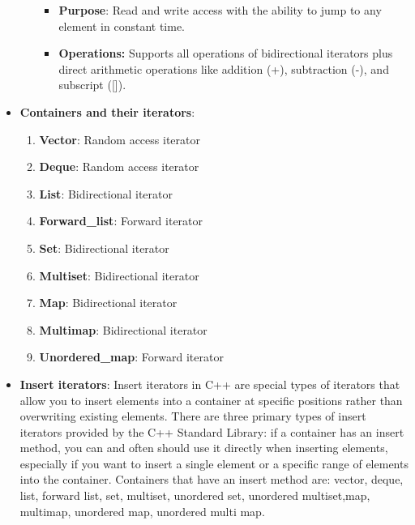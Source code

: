 \documentclass{report}
\begin{document}
\begin{itemize}
\begin{enumerate}
                    \begin{itemize}
                        \item \textbf{Purpose}: Read and write access with the ability to jump to any element in constant time.
                        \item \textbf{Operations:} Supports all operations of bidirectional iterators plus direct arithmetic operations like addition (+), subtraction (-), and subscript ([]).
                    \end{itemize}
            \end{enumerate}
        \item \textbf{Containers and their iterators}:
            \begin{enumerate}
                \item \textbf{Vector}: Random access iterator
                \item \textbf{Deque}: Random access iterator
                \item \textbf{List}: Bidirectional iterator
                \item \textbf{Forward\_list}: Forward iterator
                \item \textbf{Set}: Bidirectional iterator
                \item \textbf{Multiset}: Bidirectional iterator
                \item \textbf{Map}: Bidirectional iterator
                \item \textbf{Multimap}: Bidirectional iterator
                \item \textbf{Unordered\_map}: Forward iterator
            \end{enumerate}
        \item \textbf{Insert iterators}: Insert iterators in C++ are special types of iterators that allow you to insert elements into a container at specific positions rather than overwriting existing elements. There are three primary types of insert iterators provided by the C++ Standard Library:
            \bigbreak \noindent 
            if a container has an insert method, you can and often should use it directly when inserting elements, especially if you want to insert a single element or a specific range of elements into the container.
            \bigbreak \noindent 
            Containers that have an insert method are: vector, deque, list, forward list, set, multiset, unordered set, unordered multiset,map, multimap, unordered map, unordered multi map.
            \bigbreak \noindent 

\end{itemize}
\end{document}
